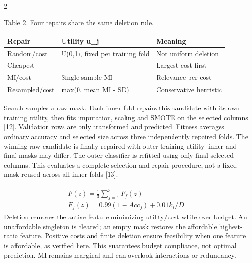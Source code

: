 \documentclass[10pt,a4paper]{article}
\begin{document}
\begin{multicols}{2}
\par\vspace{3pt}\begin{minipage}{\linewidth}{\footnotesize Table 2. Four repairs share the same deletion rule.\par}
{\fontsize{6.8}{8.3}\selectfont\setlength{\tabcolsep}{2pt}\renewcommand{\arraystretch}{1.1}
\begin{tabularx}{\linewidth}{>{\hsize=1.0000\hsize\raggedright\arraybackslash}X>{\hsize=1.0000\hsize\raggedright\arraybackslash}X>{\hsize=1.0000\hsize\raggedright\arraybackslash}X}\toprule
Repair & Utility u\_j & Meaning\\\midrule
Random/cost & U(0,1), fixed per training fold & Not uniform deletion\\
Cheapest & 1 & Largest cost first\\
MI/cost & Single-sample MI & Relevance per cost\\
Resampled/cost & max(0, mean MI - SD) & Conservative heuristic\\
\bottomrule\end{tabularx}}
\end{minipage}\par\vspace{3pt}
Search samples a raw mask. Each inner fold repairs this candidate with its own training utility, then fits imputation, scaling and SMOTE on the selected columns [12]. Validation rows are only transformed and predicted. Fitness averages ordinary accuracy and selected size across three independently repaired folds. The winning raw candidate is finally repaired with outer-training utility; inner and final masks may differ. The outer classifier is refitted using only final selected columns. This evaluates a complete selection-and-repair procedure, not a fixed mask reused across all inner folds [13].

\begin{equation}\begin{gathered}\begin{gathered}F(z)=\frac13\sum_{f=1}^3F_f(z)\\F_f(z)=0.99(1-Acc_f)+0.01k_f/D\end{gathered}\end{gathered}\end{equation}
Deletion removes the active feature minimizing utility/cost while over budget. An unaffordable singleton is cleared; an empty mask restores the affordable highest-ratio feature. Positive costs and finite deletion ensure feasibility when one feature is affordable, as verified here. This guarantees budget compliance, not optimal prediction. MI remains marginal and can overlook interactions or redundancy.


\end{multicols}
\end{document}
